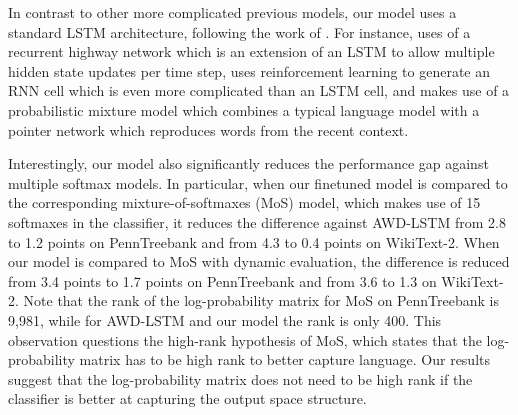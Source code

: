 \documentclass{article}
\begin{document}
In contrast to other more complicated previous models, our model uses a standard LSTM architecture, following the work of  \citet{merity2017regularizing,melis2017state}. For instance, \citet{zilly2016recurrent} uses of a recurrent highway network which is an extension of an LSTM to allow multiple hidden state updates per time step,  \citet{zoph2016neural} uses reinforcement learning to generate an RNN cell which is even more complicated than an LSTM cell, and \citet{merity2016pointer} makes use of a probabilistic mixture model which combines a typical language model with a pointer network  which reproduces words from the recent context. 


Interestingly, our model also significantly reduces the performance gap against multiple softmax models.  In particular, when our finetuned model is compared to the corresponding mixture-of-softmaxes (MoS) model, which makes use of 15 softmaxes in the classifier, it reduces the difference against AWD-LSTM from 2.8 to 1.2 points on PennTreebank and from 4.3 to 0.4 points  on WikiText-2. When our model is compared to MoS with dynamic evaluation, the difference is reduced from 3.4 points to 1.7 points on PennTreebank and from 3.6 to 1.3 on WikiText-2. Note that the rank of the log-probability matrix for MoS on PennTreebank is 9,981, while for AWD-LSTM and our model the rank is only 400. This observation questions the high-rank hypothesis of MoS, which states that the log-probability matrix has to be high rank to better capture language. Our results suggest that the log-probability matrix does not need to be high rank if the classifier is better at capturing the output space structure.
 
\end{document}
